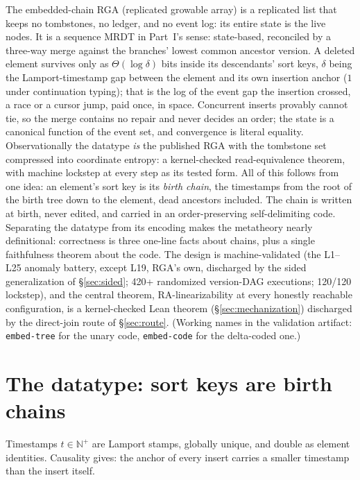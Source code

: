 \documentclass[11pt]{article}
\newcommand{\code}[1]{\texttt{#1}}
\begin{document}
\noindent
The embedded-chain RGA (replicated growable array) is a replicated
list that keeps no tombstones, no ledger, and no event log: its
entire state is the live nodes. It is a sequence MRDT in Part~I's
sense: state-based, reconciled by a three-way merge against the
branches' lowest common ancestor version. A deleted element survives
only as $\Theta(\log \delta)$ bits inside its descendants' sort keys,
$\delta$ being the Lamport-timestamp gap between the element and its
own insertion anchor ($1$ under continuation typing); that is the
log of the event gap the insertion crossed, a race or a cursor
jump, paid once, in space.
Concurrent inserts provably cannot tie, so the merge
contains no repair and never decides an order; the state is a
canonical function of the event set, and convergence is literal
equality. Observationally the datatype \emph{is} the published RGA
with the tombstone set compressed into coordinate entropy: a
kernel-checked read-equivalence theorem, with machine lockstep at
every step as its tested form. All of this follows
from one idea: an element's sort key is its \emph{birth chain}, the
timestamps from the root of the birth tree down to the element, dead
ancestors included. The chain is written at birth, never edited, and
carried in an order-preserving self-delimiting code. Separating the datatype
from its encoding makes the metatheory nearly definitional:
correctness is three one-line facts about chains, plus a single
faithfulness theorem about the code. The design is machine-validated
(the L1--L25 anomaly battery, except L19, RGA's own, discharged by
the sided generalization of \S\ref{sec:sided}; 420+ randomized
version-DAG executions; 120/120 lockstep), and the central theorem,
RA-linearizability at every honestly reachable configuration,
is a kernel-checked Lean theorem (\S\ref{sec:mechanization})
discharged by the direct-join route of \S\ref{sec:route}. (Working
names in the validation artifact: \code{embed-tree} for the unary
code, \code{embed-code} for the delta-coded one.)

\section{The datatype: sort keys are birth chains}
\label{sec:design}

Timestamps $t \in \mathbb{N}^{+}$ are Lamport stamps, globally unique,
and double as element identities. Causality gives: the anchor of every
insert carries a smaller timestamp than the insert itself.
\end{document}
